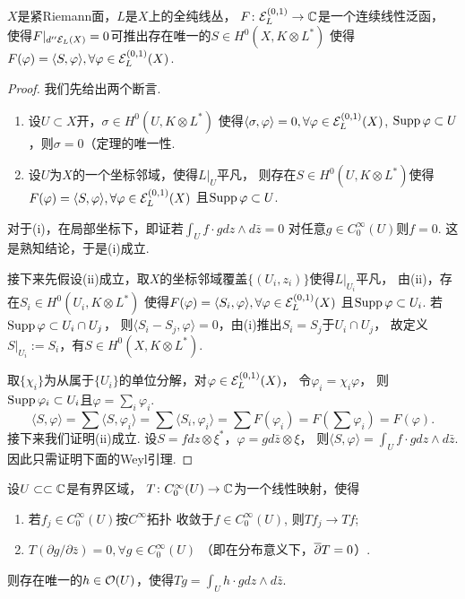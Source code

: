 \begin{theorem}[表示定理]
	$X$是紧Riemann面，$L$是$X$上的全纯线丛，
    $F\colon\mathcal{E}_L^{(0,1)}\rightarrow \mathbb{C}$是一个连续线性泛函，
    使得$F|_{d''\mathcal{E}_L(X)}=0$可推出存在唯一的$S\in H^0(X,K\otimes L^*)$
    使得$F(\varphi)=\langle S,\varphi\rangle, \forall \varphi\in \mathcal{E}_L^{(0,1)}(X)$.
\end{theorem}

\begin{proof}
	我们先给出两个断言. 
    \begin{enumerate}
        \item[(i)] 设$U\subset X$开，$\sigma\in H^0(U,K\otimes L^*)$
        使得$\langle \sigma,\varphi\rangle =0, \forall \varphi\in \mathcal{E}_L^{(0,1)}(X)$, 
        $\operatorname{Supp} \varphi \subset U$，则$\sigma=0$（定理的唯一性.
        \item[(ii)] 设$U$为$X$的一个坐标邻域，使得$L|_U$平凡，
        则存在$S\in H^0(U,K\otimes L^*)$使得
        $F(\varphi)=\langle S,\varphi\rangle, \forall \varphi \in \mathcal{E}_L^{(0,1)}(X)$
        且$\operatorname{Supp} \varphi\subset U$.
    \end{enumerate} 

    对于(i)，在局部坐标下，即证若$\int_U f\cdot gdz\wedge d\bar{z}=0$ 对任意$g\in C^\infty_0(U)$则$f=0$. 这是熟知结论，于是(i)成立.

	接下来先假设(ii)成立，取$X$的坐标邻域覆盖$\{(U_i,z_i)\}$使得$L|_{U_i}$平凡，
    由(ii)，存在$S_i\in H^0(U_i,K\otimes L^*)$
    使得$F(\varphi)=\langle S_i,\varphi\rangle, \forall \varphi\in \mathcal{E}_L^{(0,1)}(X)$
    且$\operatorname{Supp} \varphi\subset U_i$. 若$\operatorname{Supp} \varphi\subset U_i\cap U_j$，
    则$\langle S_i-S_j,\varphi\rangle =0$，由(i)推出$S_i=S_j$于$U_i\cap U_j$，
    故定义$S|_{U_i}:=S_i$，有$S\in H^0(X,K\otimes L^*)$.

	取$\{\chi_i\}$为从属于$\{U_i\}$的单位分解，对$\varphi\in \mathcal{E}_L^{(0,1)}(X)$，
    令$\varphi_i=\chi_i\varphi$，
    则$\operatorname{Supp} \varphi_i\subset U_i$且$\varphi=\sum\limits_i\varphi_i$. 
	$$\langle S,\varphi\rangle=\sum \langle S,\varphi_i\rangle 
    =\sum \langle S_i,\varphi_i\rangle =\sum F(\varphi_i)
    =F(\sum \varphi_i)=F(\varphi).$$
	接下来我们证明(ii)成立. 设$S=fdz\otimes \xi^*$，$\varphi=gd\bar{z}\otimes \xi$，
    则$\langle S,\varphi\rangle =\int_U f\cdot gdz\wedge d\bar{z}$. 
    因此只需证明下面的Weyl引理.
\end{proof}

\begin{lemma}[Weyl引理]
	设$U\subset \subset \mathbb{C}$是有界区域，
    $T\colon C^\infty_0(U)\rightarrow \mathbb{C}$为一个线性映射，使得
    \begin{enumerate}
	\item 若$f_j \in C^\infty_0(U)$按$C^\infty$拓扑
    收敛于$f\in C^\infty_0(U)$, 则$Tf_j\rightarrow Tf$;
	
    \item $T(\partial g/\partial \bar{z})=0, \forall g\in C^\infty_0(U)$
    （即在分布意义下，$\overline{\partial} T=0$）.
    \end{enumerate}
	则存在唯一的$h\in \mathcal{O}(U)$，使得$Tg=\int_U h\cdot gdz\wedge d\bar{z}$.
\end{lemma}

